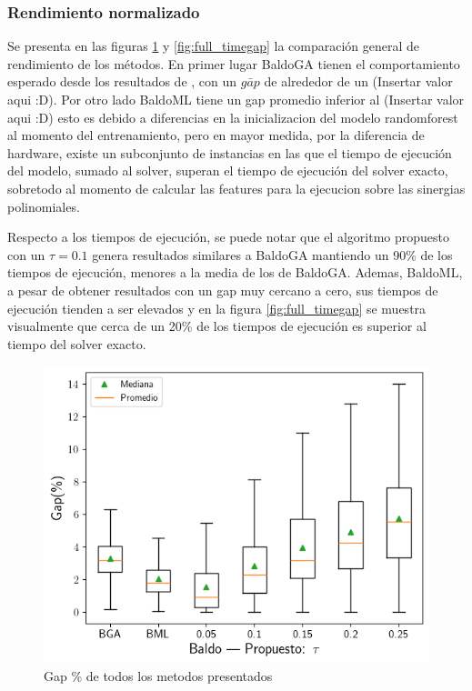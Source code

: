 \documentclass[spanish, a4paper, 12pt, openany,final]{book}
\begin{document}
\subsubsection*{Rendimiento normalizado}
Se presenta en las figuras \ref{fig:full_gap} y \ref{fig:full_timegap} la comparación general de rendimiento de los métodos. En primer lugar BaldoGA tienen el comportamiento esperado desde los resultados de \cite{baldo_polynomial_2023}, con un $\bar{gap}$ de alrededor de un (Insertar valor aqui :D). Por otro lado BaldoML tiene un gap promedio inferior al (Insertar valor aqui :D) esto es debido a diferencias en la inicializacion del modelo randomforest al momento del entrenamiento, pero en mayor medida, por la diferencia de hardware, existe un subconjunto de instancias en las que el tiempo de ejecución del modelo, sumado al solver, superan el tiempo de ejecución del solver exacto, sobretodo al momento de calcular las features para la ejecucion sobre las sinergias polinomiales.

Respecto a los tiempos de ejecución, se puede notar que el algoritmo propuesto con un $\tau = 0.1$ genera resultados similares a BaldoGA mantiendo un 90\% de los tiempos de ejecución, menores a la media de los de BaldoGA. Ademas, BaldoML, a pesar de obtener resultados con un gap muy cercano a cero, sus tiempos de ejecución tienden a ser elevados y en la figura \ref{fig:full_timegap} se muestra visualmente que cerca de un 20\% de los tiempos de ejecución es superior al tiempo del solver exacto.


\begin{figure}[H]
	\centering
	\includegraphics[scale=0.7]{graphs/full_gap_comparison.png}
	\caption{Gap \% de todos los metodos presentados}
	\label{fig:full_gap}
\end{figure}
\end{document}
